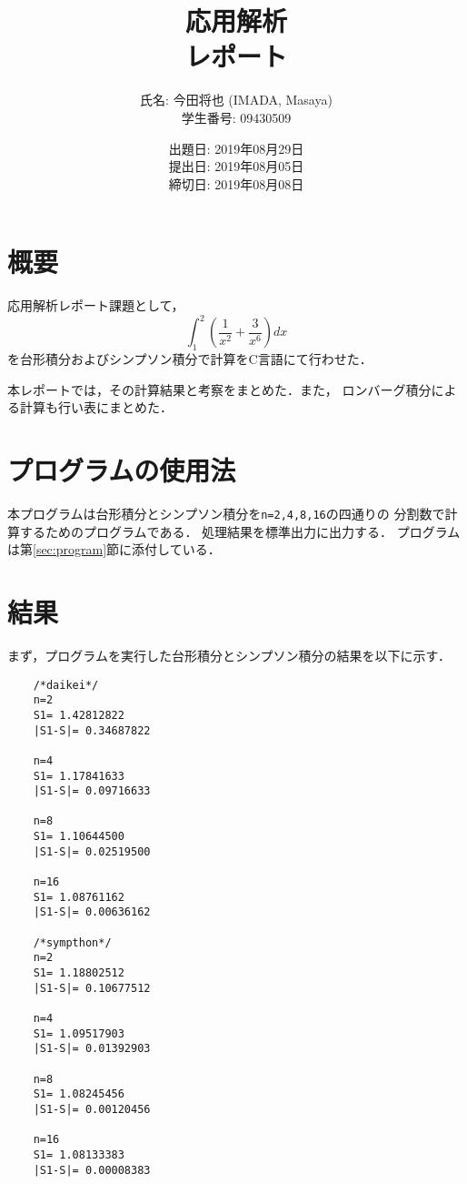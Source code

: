 \documentclass[a4j,11pt]{jarticle}
\title{応用解析 \\
       レポート}
\author{氏名: 今田将也 (IMADA, Masaya) \\
        学生番号: 09430509}
\date{出題日: 2019年08月29日 \\
      提出日: 2019年08月05日 \\
      締切日: 2019年08月08日 \\}  %
\begin{document}
\maketitle

\section{概要}\label{sec:gaiyou}
応用解析レポート課題として，
\begin{displaymath}
    \int^{2}_{1} \left(\frac{1}{x^{2}}+\frac{3}{x^{6}}\right) dx
\end{displaymath}
を台形積分およびシンプソン積分で計算をC言語にて行わせた．

本レポートでは，その計算結果と考察をまとめた．また，
ロンバーグ積分による計算も行い表にまとめた．
\section{プログラムの使用法}\label{sec:use}

本プログラムは台形積分とシンプソン積分を\verb|n=2,4,8,16|の四通りの
分割数で計算するためのプログラムである．
処理結果を標準出力に出力する．
プログラムは第\ref{sec:program}節に添付している．

\section{結果}

まず，プログラムを実行した台形積分とシンプソン積分の結果を以下に示す．
\begin{verbatim}
    /*daikei*/
    n=2
    S1= 1.42812822
    |S1-S|= 0.34687822
    
    n=4
    S1= 1.17841633
    |S1-S|= 0.09716633
    
    n=8
    S1= 1.10644500
    |S1-S|= 0.02519500
    
    n=16
    S1= 1.08761162
    |S1-S|= 0.00636162
    
    /*sympthon*/
    n=2
    S1= 1.18802512
    |S1-S|= 0.10677512
    
    n=4
    S1= 1.09517903
    |S1-S|= 0.01392903
    
    n=8
    S1= 1.08245456
    |S1-S|= 0.00120456
    
    n=16
    S1= 1.08133383
    |S1-S|= 0.00008383
\end{verbatim}
\end{document}
